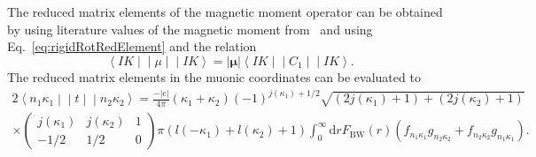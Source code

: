 The reduced matrix elements of the magnetic moment operator can be obtained by using literature values of the magnetic moment  from~\cite{Stone2005} and using Eq.~\eqref{eq:rigidRotRedElement} and the relation
\begin{equation}
\left< IK\middle|\middle|\mu \middle|\middle|IK\right> =
|\mathbf{\mu}| \left< IK\middle|\middle|C_1 \middle|\middle|IK\right>.
\end{equation}
The reduced matrix elements in the muonic coordinates can be evaluated to~\cite{johnson2007}
\begin{alignat}{2}
\left< n_1\kappa_1\middle|\middle|t \middle|\middle| n_2\kappa_2\right> = \frac{-|e|}{4\pi}(\kappa_1+\kappa_2)(-1)^{j(\kappa_1)+1/2}\sqrt{(2j(\kappa_1)+1)+(2j(\kappa_2)+1)}\qquad\quad\;\\[7.5pt]
\times
\begin{pmatrix}
j(\kappa_1)&j(\kappa_2)&1\\
-1/2&1/2&0
\end{pmatrix}
\pi(l(-\kappa_1)+l(\kappa_2)+1)\int_0^\infty \text{d}r F_{\text{BW}}(r)\left(f_{n_1\kappa_1}g_{n_2\kappa_2}+f_{n_2\kappa_2}g_{n_1\kappa_1} \right).
\end{alignat}


